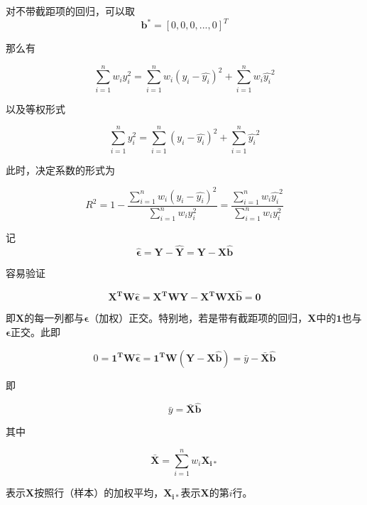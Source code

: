 \begin{mingti}
    对不带截距项的回归，可以取
    \begin{equation}
        \bm{b^*} = [0,0,0,...,0]^T
    \end{equation}

    那么有

    \begin{equation}
        \sum_{i=1}^nw_iy_i^2 = \sum_{i=1}^nw_i(y_i - \hat{y_i})^2 + \sum_{i=1}^nw_i\hat{y_i} ^2
    \end{equation}

    以及等权形式

    \begin{equation}
        \sum_{i=1}^ny_i^2 = \sum_{i=1}^n(y_i - \hat{y_i})^2 + \sum_{i=1}^n\hat{y_i} ^2
    \end{equation}

    此时，决定系数的形式为

    \begin{equation}
        R^2 = 1 - \frac{\sum_{i=1}^nw_i(y_i - \hat{y_i})^2}{\sum_{i=1}^nw_iy_i^2} = \frac{\sum_{i=1}^nw_i\hat{y_i}^2}{\sum_{i=1}^nw_iy_i^2}
    \end{equation}
\end{mingti}

\begin{mingti}
    记
    \begin{equation}
        \bm{\hat{\epsilon}} = \bm{Y} - \bm{\hat{Y}} = \bm{Y} - \bm{X\hat{b}}
    \end{equation}

    容易验证

    \begin{equation}\label{eq_eps_by_X}
        \bm{X^TW\hat{\epsilon}} = \bm{X^TWY} - \bm{X^TWX\hat{b}} = \bm{0}
    \end{equation}

    即$\bm{X}$的每一列都与$\bm{\epsilon}$（加权）正交。特别地，若是带有截距项的回归，$\bm{X}$中的$\bm{1}$也与$\bm{\epsilon}$正交。此即

    \begin{equation}
        0 = \bm{1^TW\hat{\epsilon}} = \bm{1^TW(Y - X\hat{b})} = \bar{y} - \bm{\bar{X}\hat{b}}
    \end{equation}

    即

    \begin{equation}
        \bar{y} = \bm{\bar{X}\hat{b}}
    \end{equation}

    其中

    \begin{equation}
        \bm{\bar{X}} = \sum_{i=1}^nw_i\bm{X_{i*}}
    \end{equation}

    表示$\bm{X}$按照行（样本）的加权平均，$\bm{X_{i*}}$表示$\bm{X}$的第$i$行。
\end{mingti}

